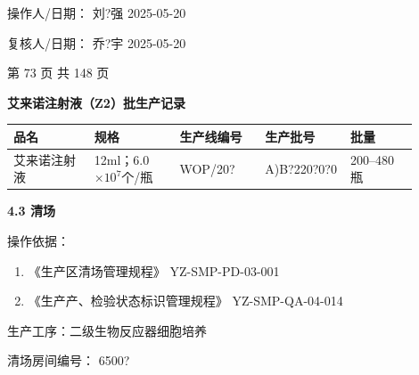 \documentclass[UTF8,10pt,a4paper,fontset=fandol]{ctexart}
\newcommand{\fieldvalue}[1]{#1}
\newcommand{\handwritten}[1]{#1}
\begin{document}
操作人/日期：
\fieldvalue{\handwritten{刘?强}}
\quad
\fieldvalue{\handwritten{2025-05-20}}

\hfill
复核人/日期：
\fieldvalue{\handwritten{乔?宇}}
\quad
\fieldvalue{\handwritten{2025-05-20}}

\begin{center}
第 73 页 共 148 页
\end{center}

\newpage

\begin{center}
\textbf{艾来诺注射液（Z2）批生产记录}
\end{center}

\begin{tabular}{|p{0.18\linewidth}|p{0.19\linewidth}|p{0.19\linewidth}|p{0.19\linewidth}|p{0.15\linewidth}|}
\hline
品名 & 规格 & 生产线编号 & 生产批号 & 批量 \\
\hline
\fieldvalue{艾来诺注射液}
&
\fieldvalue{12ml；6.0$\times 10^{7}$个/瓶}
&
\fieldvalue{\handwritten{WOP/20?}}
&
\fieldvalue{\handwritten{A)B?220?0?0}}
&
\fieldvalue{200--480瓶}
\\
\hline
\end{tabular}

\medskip

\textbf{4.3 清场}

操作依据：

\begin{enumerate}
    \item 《生产区清场管理规程》 \hfill YZ-SMP-PD-03-001
    \item 《生产产、检验状态标识管理规程》 \hfill YZ-SMP-QA-04-014
\end{enumerate}

生产工序：二级生物反应器细胞培养

清场房间编号：
\fieldvalue{\handwritten{6500?}}
\end{document}

